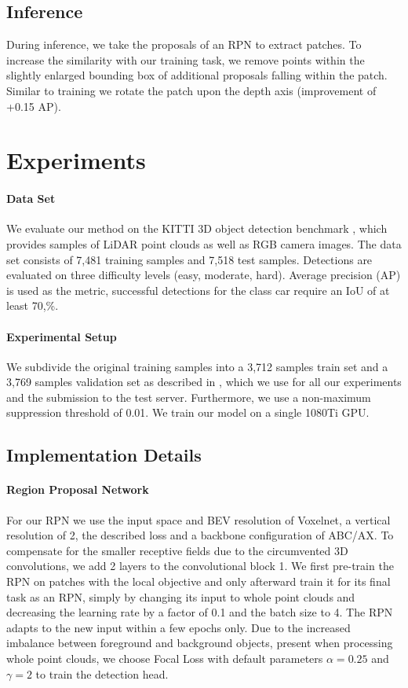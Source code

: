 \documentclass{article}
\begin{document}
\subsection{Inference} \label{sec:inference}
During inference, we take the proposals of an RPN to extract patches. To increase the similarity with our training task, we remove points within the slightly enlarged bounding box of additional proposals falling within the patch. Similar to training we rotate the patch upon the depth axis (improvement of +0.15 AP).

 \section{Experiments}
 \paragraph{Data Set}
We evaluate our method on the KITTI 3D object detection benchmark \cite{Geiger2012kitti}, which provides samples of LiDAR point clouds as well as RGB camera images. 
The data set consists of 7,481 training samples and 7,518 test samples. 
Detections are evaluated on three difficulty levels (easy, moderate, hard). 
Average precision (AP) is used as the metric, successful detections for the class car require an IoU of at least 70,\%. 

\paragraph{Experimental Setup}
We subdivide the original training samples into a 3,712 samples train set and a 3,769 samples validation set as described in \cite{Chen2015objprop}, which we use for all our experiments and the submission to the test server. Furthermore, we use a non-maximum suppression threshold of 0.01. We train our model on a single 1080Ti GPU.

\subsection{Implementation Details}

\paragraph{Region Proposal Network} For our RPN we use the input space and BEV resolution of Voxelnet, a vertical resolution of 2, the described loss and a backbone configuration of ABC/AX. To compensate for the smaller receptive fields due to the circumvented 3D convolutions, we add 2 layers to the convolutional block 1. We first pre-train the RPN on patches with the local objective and only afterward train it for its final task as an RPN, simply by changing its input to whole point clouds and decreasing the learning rate by a factor of 0.1 and the batch size to 4. The RPN adapts to the new input within a few epochs only. Due to the increased imbalance between foreground and background objects, present when processing whole point clouds, we choose Focal Loss \cite{Lin2017focal} with default parameters $\alpha=0.25$ and $\gamma=2$ to train the detection head. 
\end{document}
